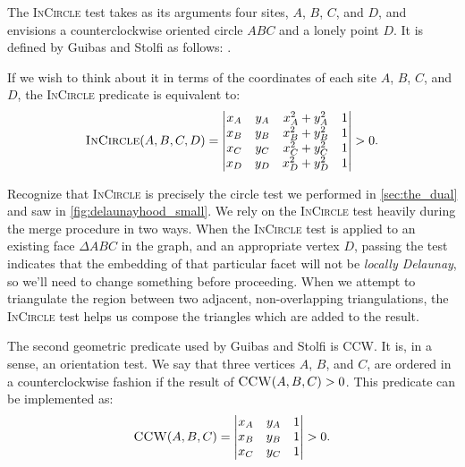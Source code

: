 \documentclass[12pt,twoside]{reedthesis}
\begin{document}
      The \textsc{InCircle} test takes as its arguments four sites, $A$, $B$, $C$, and $D$, and envisions a counterclockwise oriented circle $ABC$ and a lonely point $D$. It is defined by Guibas and Stolfi as follows:  \cite[p.~106]{guibas}. 
    
      If we wish to think about it in terms of the coordinates of each site $A$, $B$, $C$, and $D$, the \textsc{InCircle} predicate is equivalent to:
      $$
      \textsc{InCircle}(A,B,C,D) =
      \begin{vmatrix}
      x_{A} & y_{A} & x_{A}^2 + y_{A}^2 & 1 \\
      x_{B} & y_{B} & x_{B}^2 + y_{B}^2 & 1 \\
      x_{C} & y_{C} & x_{C}^2 + y_{C}^2 & 1 \\  
      x_{D} & y_{D} & x_{D}^2 + y_{D}^2 & 1 \\  
      \end{vmatrix} > 0.
      $$  

      Recognize that \textsc{InCircle} is precisely the circle test we performed in \cref{sec:the_dual} and saw in \cref{fig:delaunayhood_small}. We rely on the \textsc{InCircle} test heavily during the merge procedure in two ways. When the \textsc{InCircle} test is applied to an existing face $\Delta ABC$ in the graph, and an appropriate vertex $D$, passing the test indicates that the embedding of that particular facet will not be \emph{locally Delaunay}, so we'll need to change something before proceeding. When we attempt to triangulate the region between two adjacent, non-overlapping triangulations, the \textsc{InCircle} test helps us compose the triangles which are added to the result.\par

      The second geometric predicate used by Guibas and Stolfi is \textsc{CCW}. It is, in a sense, an orientation test. We say that three vertices $A$, $B$, and $C$, are ordered in a counterclockwise fashion if the result of $\textsc{CCW}(A, B, C) > 0$. This predicate can be implemented as:
      $$
      \textsc{CCW}(A,B,C) =
      \begin{vmatrix}
      x_{A} & y_{A} & 1 \\
      x_{B} & y_{B} & 1 \\
      x_{C} & y_{C} & 1 \\  
      \end{vmatrix} > 0.
      $$  
\end{document}

